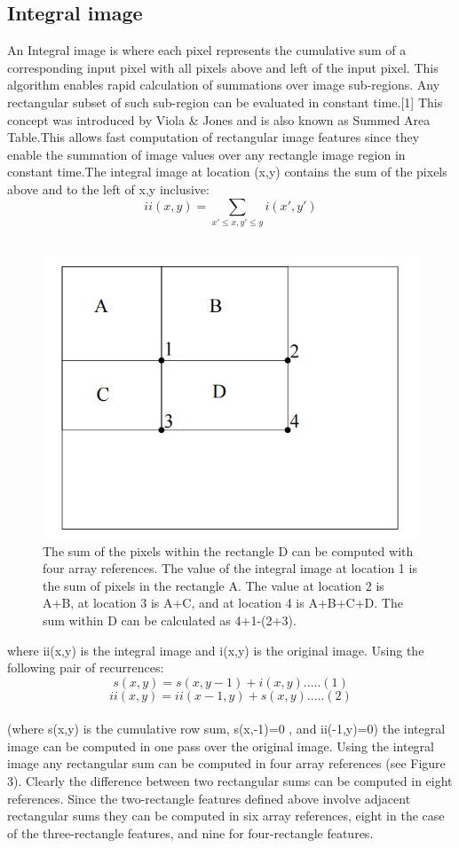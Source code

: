 \documentclass[12pt,a4paper]{article}
\begin{document}
\subsection{Integral image}
An Integral image is where each pixel represents the cumulative sum of a corresponding input pixel with all pixels above and left of the input pixel. This algorithm enables rapid calculation of summations over image sub-regions. Any rectangular subset of such sub-region can be evaluated in constant time.[1]
This concept was introduced by Viola \& Jones and is also known as Summed Area Table.This allows fast computation of rectangular image features since they enable the summation of image values over any rectangle image region in constant time.The integral image at location (x,y) contains
the sum of the pixels above and to the left of x,y inclusive:\[ii(x,y)=\sum_{x'\leqslant x,y'\leqslant y} i(x',y') \] \\
\begin{figure}[ht!]
\centerline{\includegraphics[scale=0.7]{integral_image.png}}
\caption{The sum of the pixels within the rectangle D can be computed with four array references. The value of the integral image at location 1 is the sum of pixels in the rectangle A. The value at location 2 is A+B, at location 3 is A+C, and at location 4 is A+B+C+D. The sum within D can be calculated as 4+1-(2+3). }
\label{fig 3}
\end{figure}
where ii(x,y) is the integral image and i(x,y) is the original image. Using the following pair of recurrences:\[ s(x,y) = s(x,y-1)+i(x,y) .....(1) \] \[ii(x,y) = ii(x-1,y)+s(x,y) .....(2) \] \\
(where s(x,y) is the cumulative row sum, s(x,-1)=0 , and ii(-1,y)=0) the integral image can be computed in one pass over the original image.
Using the integral image any rectangular sum can be computed in four array references (see Figure 3). Clearly the difference between two rectangular sums can be computed in eight references. Since the two-rectangle features defined above involve adjacent rectangular sums they can be computed in six array references, eight in the case of the three-rectangle features, and nine for four-rectangle features.
\end{document}
